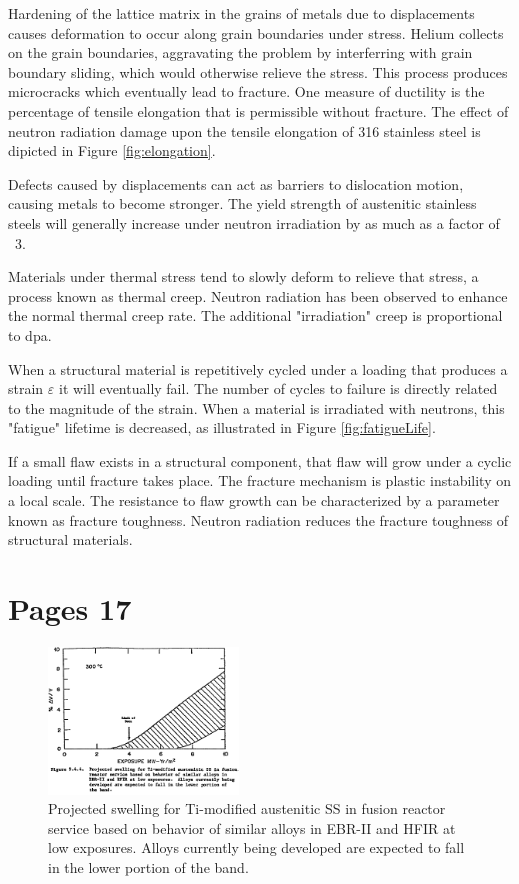 \documentclass[11pt]{report} %
\begin{document}
Hardening of the lattice matrix in the grains of metals due to displacements causes deformation to occur along grain boundaries under stress. Helium collects on the grain boundaries, aggravating the problem by interferring with grain boundary sliding, which would otherwise relieve the stress. This process produces microcracks which eventually lead to fracture. One measure of ductility is the percentage of tensile elongation that is permissible without fracture. The effect of neutron radiation damage upon the tensile elongation of 316 stainless steel is dipicted in Figure \ref{fig:elongation}. 

Defects caused by displacements can act as barriers to dislocation motion, causing metals to become stronger. The yield strength of austenitic stainless steels will generally increase under neutron irradiation by as much as a factor of ~3.

Materials under thermal stress tend to slowly deform to relieve that stress, a process known as thermal creep. Neutron radiation has been observed to enhance the normal thermal creep rate. The additional "irradiation" creep is proportional to dpa.

When a structural material is repetitively cycled under a loading that produces a strain $\varepsilon$ it will eventually fail. The number of cycles to failure is directly related to the magnitude of the strain. When a material is irradiated with neutrons, this "fatigue" lifetime is decreased, as illustrated in Figure \ref{fig:fatigueLife}.

If a small flaw exists in a structural component, that flaw will grow under a cyclic loading until fracture takes place. The fracture mechanism is plastic instability on a local scale. The resistance to flaw growth can be characterized by a parameter known as fracture toughness. Neutron radiation reduces the fracture toughness of structural materials.

\section{Pages 17}

\begin{figure}[H]
  \centering
  \includegraphics[width=0.45\textwidth]{figs/swelling.png}
  \caption{Projected swelling for Ti-modified austenitic SS in fusion reactor service based on behavior of similar alloys in EBR-II and HFIR at low exposures. Alloys currently being developed are expected to fall in the lower portion of the band.}
  \label{fig:swelling}
\end{figure}
\end{document}

